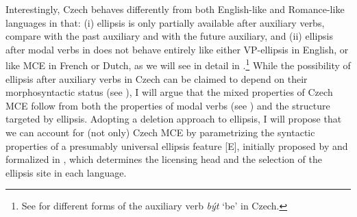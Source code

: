 \documentclass[output=paper,colorlinks,citecolor=brown,
modfonts
]{langscibook}
\begin{document}
\noindent Interestingly, Czech behaves differently from both English-like and Romance-like languages in that: (i) ellipsis is only partially available after auxiliary verbs, compare  with the past auxiliary and  with the future auxiliary, and (ii) ellipsis after modal verbs in  does not behave entirely like either VP-ellipsis in English, or like MCE in French or Dutch, as we will see in detail in .\footnote{See  for different forms of the auxiliary verb \textit{být} `be' in Czech.} While the possibility of ellipsis after auxiliary verbs in Czech can be claimed to depend on their morphosyntactic status (see ), I will argue that the mixed properties of Czech MCE follow from both the properties of modal verbs (see  ) and the structure targeted by ellipsis. Adopting a deletion approach to ellipsis, I will propose that we can account for (not only) Czech MCE by parametrizing the syntactic properties of a presumably universal ellipsis feature [E], initially proposed by \cite{Lobeck1995} and formalized in \cite{Merchant2001}, which determines the licensing head and the selection of the ellipsis site in each language. 

\begin{exe}
\ex
\begin{xlist}
\end{xlist}
\end{exe}
\end{document}
